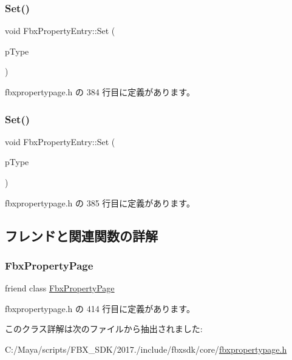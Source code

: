 \subsubsection{\texorpdfstring{Set()}{Set()}\hspace{0.1cm}{\footnotesize\ttfamily [4/5]}}
{\footnotesize\ttfamily void Fbx\+Property\+Entry\+::\+Set (\begin{DoxyParamCaption}\item[{\hyperlink{class_fbx_property_flags}{Fbx\+Property\+Flags}}]{p\+Type }\end{DoxyParamCaption})\hspace{0.3cm}{\ttfamily [inline]}}



 fbxpropertypage.\+h の 384 行目に定義があります。

\mbox{\label{class_fbx_property_entry_ad0196c0a6783551c672a98a97450ad96}} 
\subsubsection{\texorpdfstring{Set()}{Set()}\hspace{0.1cm}{\footnotesize\ttfamily [5/5]}}
{\footnotesize\ttfamily void Fbx\+Property\+Entry\+::\+Set (\begin{DoxyParamCaption}\item[{\hyperlink{class_fbx_property_flags}{Fbx\+Property\+Flags} $\ast$}]{p\+Type }\end{DoxyParamCaption})\hspace{0.3cm}{\ttfamily [inline]}}



 fbxpropertypage.\+h の 385 行目に定義があります。



\subsection{フレンドと関連関数の詳解}
\mbox{\label{class_fbx_property_entry_ad8065889ce44304e7cc811caf583781e}} 
\subsubsection{\texorpdfstring{Fbx\+Property\+Page}{FbxPropertyPage}}
{\footnotesize\ttfamily friend class \hyperlink{class_fbx_property_page}{Fbx\+Property\+Page}\hspace{0.3cm}{\ttfamily [friend]}}



 fbxpropertypage.\+h の 414 行目に定義があります。



このクラス詳解は次のファイルから抽出されました\+:\begin{DoxyCompactItemize}
\item 
C\+:/\+Maya/scripts/\+F\+B\+X\+\_\+\+S\+D\+K/2017./include/fbxsdk/core/\hyperlink{fbxpropertypage_8h}{fbxpropertypage.\+h}\end{DoxyCompactItemize}
